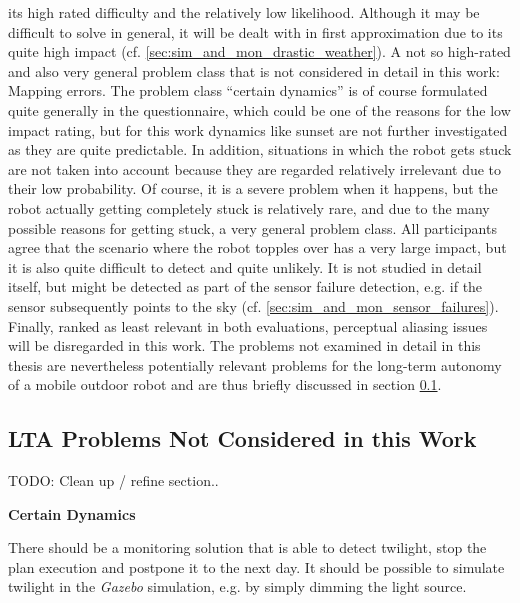 \documentclass[english, master, utf8]{base/thesis_KBS}
\begin{document}
its high rated difficulty and the relatively low likelihood. Although it may be difficult to solve in general, it will be dealt with in first approximation due to its quite high
impact (cf. \ref{sec:sim_and_mon_drastic_weather}).\newline
A not so high-rated and also very general problem class that is not considered in detail in this work: Mapping errors. The problem class ``certain dynamics'' is of course formulated
quite generally in the questionnaire, which could be one of the reasons for the low impact rating, but for this work dynamics like sunset are not further investigated as they are
quite predictable. In addition, situations in which the robot gets stuck are not taken into account because they are regarded relatively irrelevant due to their low probability.
Of course, it is a severe problem when it happens, but the robot actually getting completely stuck is relatively rare, and due to the many possible reasons for getting stuck, 
a very general problem class. All participants agree that the scenario where the robot topples over has a very large impact, but it is also quite difficult to detect and quite
unlikely. It is not studied in detail itself, but might be detected as part of the sensor failure detection, e.g. if the sensor subsequently points to the sky (cf.
\ref{sec:sim_and_mon_sensor_failures}). Finally, ranked as least relevant in both evaluations, perceptual aliasing issues will be disregarded in this work. The problems not examined in
detail in this thesis are nevertheless potentially relevant problems for the long-term autonomy of a mobile outdoor robot and are thus briefly discussed in section 
\ref{sec:lta_problems_not_considered}.

\pagebreak

\subsection{LTA Problems Not Considered in this Work}
\label{sec:lta_problems_not_considered}

TODO: Clean up / refine section..\newline

\noindent
\textbf{Certain Dynamics}\newline

\noindent
There should be a monitoring solution that is able to detect twilight, stop the plan execution and postpone it to the next day.
It should be possible to simulate twilight in the \textit{Gazebo} simulation, e.g. by simply dimming the light source.\newline
\end{document}
